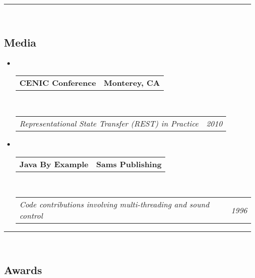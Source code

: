 \documentclass[10pt,letterpaper]{article}
\makeatletter
\newcommand{\headerrow}[2]
{\begin{tabular*}{\linewidth}{l@{\extracolsep{\fill}}r}
	#1 &
	#2 \\
\end{tabular*}}
\makeatother
\begin{document}
\hrule\
\vspace{-0.4em}
\subsection*{Media}

\begin{itemize}
	\parskip=0.1em

	\item\ 
	\headerrow
		{\textbf{CENIC Conference}}
		{\textbf{Monterey, CA}}
	\\
	\headerrow
		{\emph{Representational State Transfer (REST) in Practice}}
		{\emph{2010}}
		
	\item\ 
	\headerrow
		{\textbf{Java By Example}}
		{\textbf{Sams Publishing}}
	\\
	\headerrow
		{\emph{Code contributions involving multi-threading and sound control}}
		{\emph{1996}}
\end{itemize}


\hrule\
\vspace{-0.4em}
\subsection*{Awards}
\end{document}
